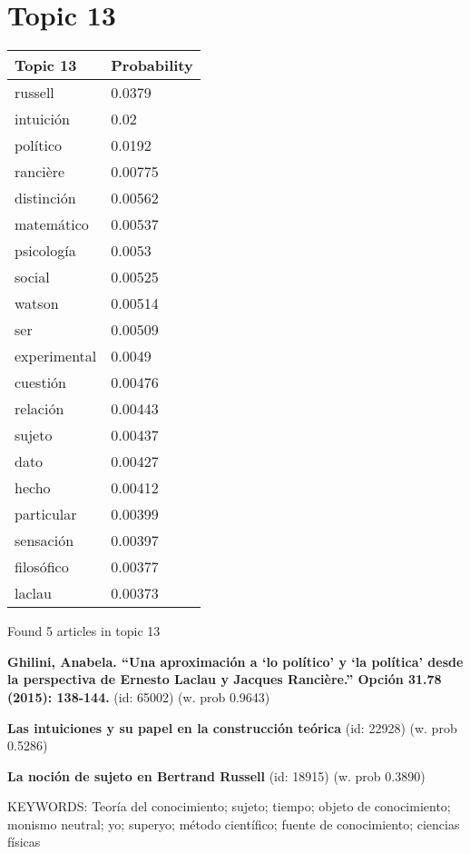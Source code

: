 \documentclass{article}
\begin{document}
\section*{Topic 13}\vfill
\begin{tabular}{ll}
\toprule
     Topic 13 & Probability \\
\midrule
      russell &      0.0379 \\
    intuición &        0.02 \\
     político &      0.0192 \\
     rancière &     0.00775 \\
   distinción &     0.00562 \\
   matemático &     0.00537 \\
   psicología &      0.0053 \\
       social &     0.00525 \\
       watson &     0.00514 \\
          ser &     0.00509 \\
 experimental &      0.0049 \\
     cuestión &     0.00476 \\
     relación &     0.00443 \\
       sujeto &     0.00437 \\
         dato &     0.00427 \\
        hecho &     0.00412 \\
   particular &     0.00399 \\
    sensación &     0.00397 \\
   filosófico &     0.00377 \\
       laclau &     0.00373 \\
\bottomrule
\end{tabular}

\vfill
Found 5 articles in topic 13
\vfill

\textbf{Ghilini, Anabela. “Una aproximación a ‘lo político’ y ‘la política’ desde la perspectiva de Ernesto Laclau y Jacques Rancière.” Opción 31.78 (2015): 138-144.} (id: 65002)
 (w. prob 0.9643)
\vfill

\textbf{Las intuiciones y su papel en la construcción teórica} (id: 22928)
 (w. prob 0.5286)
\vfill

\textbf{La noción de sujeto en Bertrand Russell} (id: 18915)
 (w. prob 0.3890)


KEYWORDS:
Teoría del conocimiento; sujeto; tiempo; objeto de conocimiento; monismo neutral; yo; superyo; método científico; fuente de conocimiento; ciencias físicas
\end{document}
